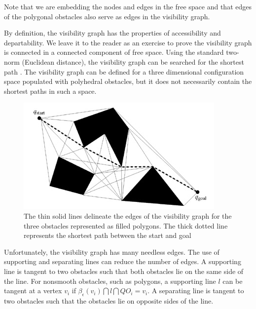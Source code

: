 \documentclass[11pt]{article}
\begin{document}
Note that we are embedding the nodes and edges in the free space and that edges of the polygonal obstacles also serve as edges in the visibility graph.

By definition, the visibility graph has the properties of accessibility and departability. We leave it to the reader as an exercise to prove the visibility graph is connected in a connected component of free space. Using the standard two-norm (Euclidean distance), the visibility graph can be searched for the shortest path . The visibility graph can be defined for a three dimensional configuration space populated with polyhedral obstacles, but it does not necessarily contain the shortest paths in such a space.\\

\begin{figure}[h]
	\centering
	\includegraphics{imgs/shortest_path.png}
	\caption{The thin solid lines delineate the edges of the visibility graph for the three obstacles represented as filled polygons. The thick dotted line represents the shortest path between the start and goal}
\end{figure}

Unfortunately, the visibility graph has many needless edges. The use of supporting and separating lines can reduce the number of edges. A supporting line is tangent to two obstacles such that both obstacles lie on the same side of the line. For nonsmooth obstacles, such as polygons, a supporting line $l$ can be tangent at a vertex $v_i$ if $\beta_\epsilon(v_i) \bigcap l \bigcap QO_i = v_i $. A separating line is tangent to two obstacles such that the obstacles lie on opposite sides of the line.\\
\end{document}
